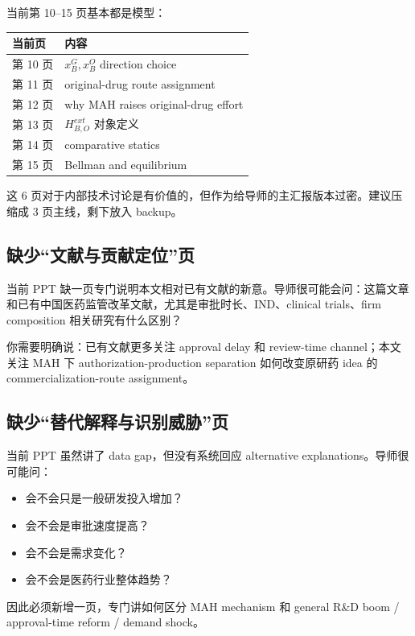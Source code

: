 \documentclass[12pt]{ctexart}
\begin{document}
当前第 10--15 页基本都是模型：

\begin{center}
\begin{tabular}{L{0.18\textwidth}L{0.68\textwidth}}
\toprule
当前页 & 内容 \\
\midrule
第 10 页 & $x_B^G,x_B^O$ direction choice \\
第 11 页 & original-drug route assignment \\
第 12 页 & why MAH raises original-drug effort \\
第 13 页 & $H^{ext}_{B,O}$ 对象定义 \\
第 14 页 & comparative statics \\
第 15 页 & Bellman and equilibrium \\
\bottomrule
\end{tabular}
\end{center}

这 6 页对于内部技术讨论是有价值的，但作为给导师的主汇报版本过密。建议压缩成 3 页主线，剩下放入 backup。

\subsection{缺少“文献与贡献定位”页}

当前 PPT 缺一页专门说明本文相对已有文献的新意。导师很可能会问：这篇文章和已有中国医药监管改革文献，尤其是审批时长、IND、clinical trials、firm composition 相关研究有什么区别？

你需要明确说：已有文献更多关注 approval delay 和 review-time channel；本文关注 MAH 下 authorization-production separation 如何改变原研药 idea 的 commercialization-route assignment。

\subsection{缺少“替代解释与识别威胁”页}

当前 PPT 虽然讲了 data gap，但没有系统回应 alternative explanations。导师很可能问：
\begin{itemize}
    \item 会不会只是一般研发投入增加？
    \item 会不会是审批速度提高？
    \item 会不会是需求变化？
    \item 会不会是医药行业整体趋势？
\end{itemize}

因此必须新增一页，专门讲如何区分 MAH mechanism 和 general R\&D boom / approval-time reform / demand shock。
\end{document}
